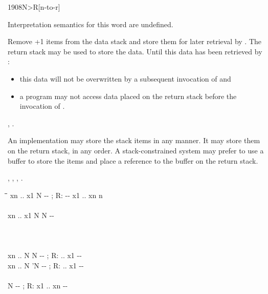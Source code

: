 
\begin{worddef}[NtoR]{1908}{N>R}[n-to-r]%

\interpret
	Interpretation semantics for this word are undefined.

\execute {} 

	Remove +1 items from the data stack and store them for later
	retrieval by . The return stack may be used to store the
	data. Until this data has been retrieved by :
	\begin{itemize}
	\item this data will not be overwritten by a subsequent invocation of
		 and
	\item a program may not access data placed on the return stack before
		the invocation of .
	\end{itemize} 

\see {},
	  .

	\begin{rationale}
		An implementation may store the stack items in any manner.  It may
		store them on the return stack, in any order.  A stack-constrained
		system may prefer to use a buffer to store the items and place a
		reference to the buffer on the return stack.

	\see {},
	  ,
	  , \linebreak
	  .
	\end{rationale}

	\begin{implement} %

		\begin{tabbing}
		\tab \= \tab \= \tab[11] \= \kill
		\word{:}             xn .. x1 N -{}- ; R: -{}- x1 .. xn n \\
		  \+ \\
			 \>\>  xn .. x1 N N -{}- \\
			 \+ \\
				 \- \\
			 \+ \\
				   \word{toR}  \> xn .. N N -{}- ; R: .. x1 -{}- \\
				 \>  xn .. N 'N -{}- ; R: .. x1 -{}- \- \\
		 \\
		 \>\>  N -{}- ; R: x1 .. xn -{}- \\
		  \word{toR}  \- \\
		\word{;}
		\end{tabbing}
	\end{implement}


\end{worddef}
